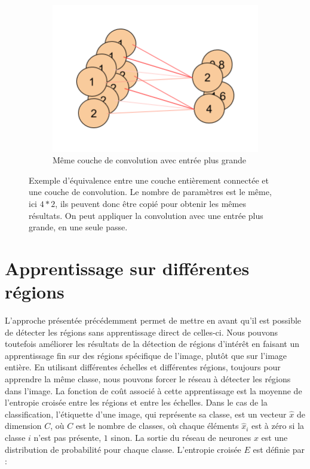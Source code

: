 \begin{figure}[htbp]
\begin{subfigure}{0.32\textwidth}
\includegraphics[width=\columnwidth]{figures/FConvolutional2(1).png}
\caption{Même couche de convolution avec entrée plus grande} \label{fig:convBig}
\end{subfigure}
\caption{Exemple d'équivalence entre une couche entièrement connectée et une couche de convolution. Le nombre de paramètres est le même, ici $4*2$, ils peuvent donc être copié pour obtenir les mêmes résultats. On peut appliquer la convolution avec une entrée plus grande, en une seule passe.} 
\label{fig:equivalencecouche}
\end{figure}



\section{Apprentissage sur différentes régions}

L'approche présentée précédemment permet de mettre en avant qu'il est possible de détecter les régions sans apprentissage direct de celles-ci.
Nous pouvons toutefois améliorer les résultats de la détection de régions d'intérêt en faisant un apprentissage fin sur des régions spécifique de l'image, plutôt que sur l'image entière.
En utilisant différentes échelles et différentes régions, toujours pour apprendre la même classe, nous pouvons forcer le réseau à détecter les régions dans l'image.
La fonction de coût associé à cette apprentissage est la moyenne de l'entropie croisée entre les régions et entre les échelles. 
Dans le cas de la classification, l’étiquette d'une image, qui représente sa classe, est un vecteur $\hat{x}$ de dimension $C$, où $C$ est le nombre de classes, où chaque éléments $\hat{x}_i$ est à zéro si la classe $i$ n'est pas présente, $1$ sinon.
La sortie du réseau de neurones $x$ est une distribution de probabilité pour chaque classe.
L'entropie croisée $E$ est définie par :

